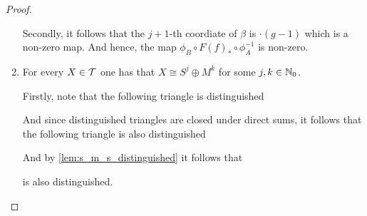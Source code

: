 \begin{proof}
\begin{enumerate}
{            Secondly, it follows that the \( j + 1 \)-th coordiate of \( \beta \) is \( \cdot(g-1) \) which is a non-zero map. And hence, the map \( \phi_B \circ F(f)_* \circ \phi_A^{-1} \) is non-zero.
        }
        \item {
            For every \( X \in {\mathcal{T}} \) one has that \( X \cong S^j \oplus M^k \) for some \( j, k \in {\mathbb{N}}_0 \).

            Firstly, note that the following triangle is distinguished
            \begin{center}
            \end{center}
            And since distinguished triangles are closed under direct sums, it follows that the following triangle is also distinguished
            \begin{center}
            \end{center}
            And by \autoref{lem:s_m_s_distinguished} it follows that
            \begin{center}
            \end{center}
            is also distinguished.

}
\end{enumerate}
\end{proof}
